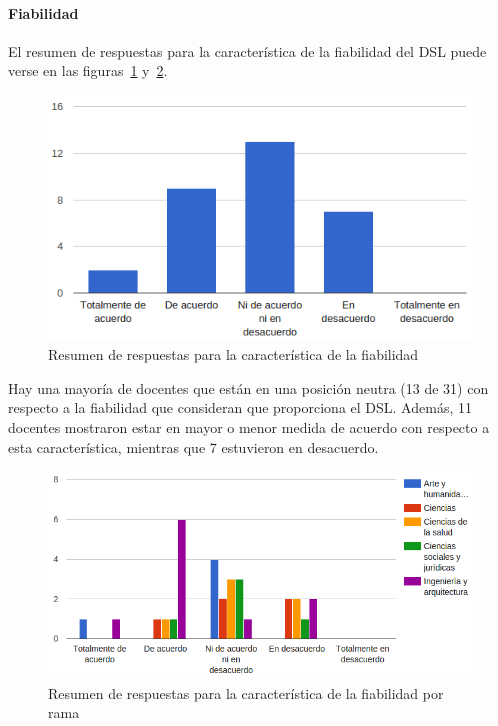 \newpage
\paragraph*{Fiabilidad}

El resumen de respuestas para la característica de la fiabilidad del DSL puede verse en las figuras~\ref{fig:evalmetodo:dsl:fiabilidad} y~\ref{fig:evalmetodo:dsl:fiabilidad:rama}.

\begin{figure}[h]
  \begin{center}
    \includegraphics[scale=0.5]{C_DSL_fiabilidad.png}
  \end{center}
  \caption{Resumen de respuestas para la característica de la fiabilidad}
  \label{fig:evalmetodo:dsl:fiabilidad}
\end{figure}

Hay una mayoría de docentes que están en una posición neutra (13 de 31) con respecto a la fiabilidad que consideran que proporciona el DSL. Además, 11 docentes mostraron estar en mayor o menor medida de acuerdo con respecto a esta característica, mientras que 7 estuvieron en desacuerdo. 

\begin{figure}[h]
  \begin{center}
    \includegraphics[scale=0.5]{C_DSL_fiabilidad_rama.png}
  \end{center}
  \caption{Resumen de respuestas para la característica de la fiabilidad por rama}
  \label{fig:evalmetodo:dsl:fiabilidad:rama}
\end{figure}
    

